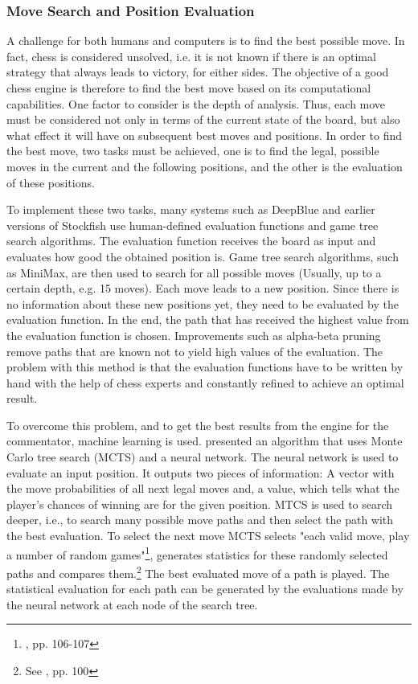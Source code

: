 \subsubsection{Move Search and Position Evaluation}

A challenge for both humans and computers is to find the best possible move. In fact, chess is considered unsolved, i.e. it is not known if there is an optimal strategy that always leads to victory, for either sides. The objective of a good chess engine is therefore to find the best move based on its computational capabilities. One factor to consider is the depth of analysis. Thus, each move must be considered not only in terms of the current state of the board, but also what effect it will have on subsequent best moves and positions. In order to find the best move, two tasks must be achieved, one is to find the legal, possible moves in the current and the following positions, and the other is the evaluation of these positions.

To implement these two tasks, many systems such as \Gls{DeepBlue} and earlier versions of \Gls{Stockfish} use human-defined evaluation functions and game tree search algorithms. The evaluation function receives the board as input and evaluates how good the obtained position is. Game tree search algorithms, such as MiniMax, are then used to search for all possible moves (Usually, up to a certain depth, e.g. 15 moves). Each move leads to a new position. Since there is no information about these new positions yet, they need to be evaluated by the evaluation function. In the end, the path that has received the highest value from the evaluation function is chosen. Improvements such as alpha-beta pruning remove paths that are known not to yield high values of the evaluation. The problem with this method is that the evaluation functions have to be written by hand with the help of chess experts and constantly refined to achieve an optimal result.

To overcome this problem, and to get the best results from the engine for the commentator, machine learning is used. \cite{alphazero-2018} presented an algorithm that uses Monte Carlo tree search (MCTS) and a neural network. The neural network is used to evaluate an input position. It outputs two pieces of information: A vector with the move probabilities of all next legal moves and, a value, which tells what the player's chances of winning are for the given position. MTCS is used to search deeper, i.e., to search many possible move paths and then select the path with the best evaluation. To select the next move MCTS selects "each valid move, play a number of random games"\footnote{\cite{nnfc-2022}, pp. 106-107}, generates statistics for these randomly selected paths and compares them.\footnote{See \cite{nnfc-2022}, pp. 100} The best evaluated move of a path is played. The statistical evaluation for each path can be generated by the evaluations made by the neural network at each node of the search tree.

